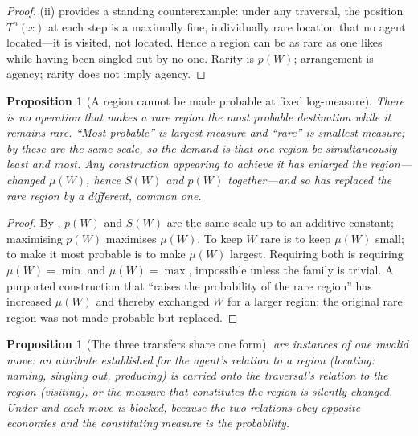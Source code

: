 \documentclass[11pt,twocolumn,a4paper]{article}
\theoremstyle{thmstyle}
\newtheorem{proposition}[theorem]{Proposition}
\theoremstyle{definition}
\theoremstyle{remark}
\begin{document}
\begin{proof}
(ii) provides a standing counterexample: under any traversal,
the position $T^{n}(x)$ at each step is a maximally fine, individually rare
location that no agent located---it is visited, not located. Hence a region can be
as rare as one likes while having been singled out by no one. Rarity is $p(W)$;
arrangement is agency; rarity does not imply agency.
\end{proof}

\begin{proposition}[A region cannot be made probable at fixed log-measure]
\label{prop:cannot-raise}
There is no operation that makes a rare region the most probable destination while
it remains rare. ``Most probable'' is largest measure and ``rare'' is smallest
measure; by  these are the same scale, so the demand is that
one region be simultaneously least and most. Any construction appearing to achieve
it has enlarged the region---changed $\mu(W)$, hence $S(W)$ and $p(W)$ together---and
so has replaced the rare region by a different, common one.
\end{proposition}

\begin{proof}
By , $p(W)$ and $S(W)$ are the same scale up to an additive
constant; maximising $p(W)$ maximises $\mu(W)$. To keep $W$ rare is to keep
$\mu(W)$ small; to make it most probable is to make $\mu(W)$ largest. Requiring
both is requiring $\mu(W)=\min$ and $\mu(W)=\max$, impossible unless the family is
trivial. A purported construction that ``raises the probability of the rare
region'' has increased $\mu(W)$ and thereby exchanged $W$ for a larger region; the
original rare region was not made probable but replaced.
\end{proof}

\begin{proposition}[The three transfers share one form]
\label{prop:one-form}
 are instances of one invalid
move: an attribute established for the agent's relation to a region
\textup{(}locating: naming, singling out, producing\textup{)} is carried onto the
traversal's relation to the region \textup{(}visiting\textup{)}, or the measure
that constitutes the region is silently changed. Under  and
 each move is blocked, because the two relations obey
opposite economies and the constituting measure is the probability.
\end{proposition}
\end{document}
